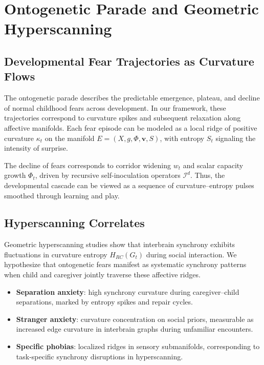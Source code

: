 \documentclass{article}
\theoremstyle{definition}
\begin{document}
\section{Ontogenetic Parade and Geometric Hyperscanning}

\subsection{Developmental Fear Trajectories as Curvature Flows}

The ontogenetic parade describes the predictable emergence, plateau, and 
decline of normal childhood fears across development. In our framework, 
these trajectories correspond to curvature spikes and subsequent relaxation 
along affective manifolds. Each fear episode can be modeled as a local ridge 
of positive curvature $\kappa_t$ on the manifold $E = (X,g,\Phi,\mathbf{v},S)$,
with entropy $S_t$ signaling the intensity of surprise.

The decline of fears corresponds to corridor widening $w_t$ and scalar 
capacity growth $\Phi_t$, driven by recursive self-inoculation operators 
$\mathcal{I}^d$. Thus, the developmental cascade can be viewed as a sequence 
of curvature–entropy pulses smoothed through learning and play.

\subsection{Hyperscanning Correlates}

Geometric hyperscanning studies show that interbrain synchrony exhibits 
fluctuations in curvature entropy $H_{RC}(G_t)$ during social interaction.
We hypothesize that ontogenetic fears manifest as systematic synchrony 
patterns when child and caregiver jointly traverse these affective ridges.

\begin{itemize}
  \item \textbf{Separation anxiety}: high synchrony curvature during 
        caregiver–child separations, marked by entropy spikes and repair cycles.
  \item \textbf{Stranger anxiety}: curvature concentration on social priors, 
        measurable as increased edge curvature in interbrain graphs during 
        unfamiliar encounters.
  \item \textbf{Specific phobias}: localized ridges in sensory submanifolds, 
        corresponding to task-specific synchrony disruptions in hyperscanning.
\end{itemize}
\end{document}
